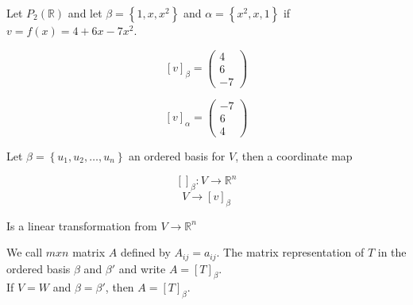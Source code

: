 \documentclass{report}
\begin{document}
    \begin{Example}
        Let $P_2(\mathbb{R})$ and let $\beta = \left\{ 1, x, x^2 \right\}$ and $\alpha = \left\{ x^2, x, 1 \right\}$ if $v = f(x) = 4 + 6x -7x^2$.

        $$[v]_\beta = \begin{pmatrix}
            4\\6\\-7
        \end{pmatrix}$$

        $$[v]_\alpha = \begin{pmatrix}
            -7\\6\\4
        \end{pmatrix}$$
    \end{Example}

    \begin{thBox}
        Let $\beta = \left\{ u_1, u_2, \dots , u_n \right\}$ an ordered basis for $V$, then a coordinate map

        $$[]_\beta: V \to \mathbb{R}^n$$
        $$V \to [v]_\beta$$

        Is a linear transformation from $V \to \mathbb{R}^n$
    \end{thBox}

    \begin{defBox}
        We call $mxn$ matrix $A$ defined by $A_{ij} = a_{ij}$. The matrix representation of $T$ in the ordered basis $\beta$ and $\beta'$ and write $A = [T]_\beta$.\\

        If $V = W$ and $\beta = \beta'$, then $A = [T]_\beta$.
    \end{defBox}
\end{document}
